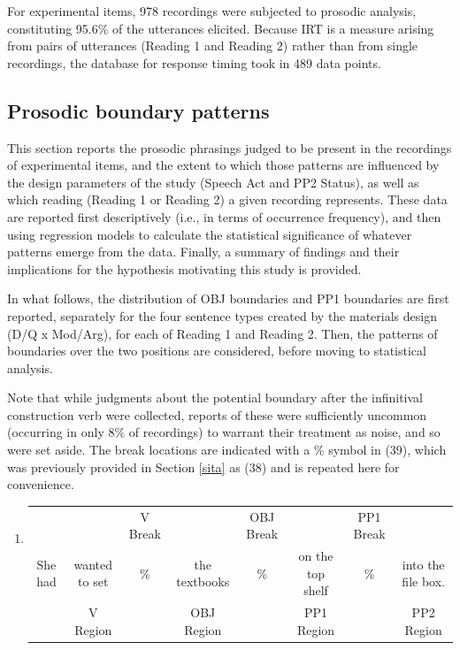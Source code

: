 \documentclass[11pt,oneside]{book}
\providecommand{\tightlist}{%
  \setlength{\itemsep}{0pt}\setlength{\parskip}{0pt}}
\begin{document}
For experimental items, 978 recordings were subjected to prosodic analysis, constituting 95.6\% of the utterances elicited. Because IRT is a measure arising from pairs of utterances (Reading 1 and Reading 2) rather than from single recordings, the database for response timing took in 489 data points.

\hypertarget{results-prosody}{%
\subsection{Prosodic boundary patterns}\label{results-prosody}}

This section reports the prosodic phrasings judged to be present in the recordings of experimental items, and the extent to which those patterns are influenced by the design parameters of the study (Speech Act and PP2 Status), as well as which reading (Reading 1 or Reading 2) a given recording represents. These data are reported first descriptively (i.e., in terms of occurrence frequency), and then using regression models to calculate the statistical significance of whatever patterns emerge from the data. Finally, a summary of findings and their implications for the hypothesis motivating this study is provided.

In what follows, the distribution of OBJ boundaries and PP1 boundaries are first reported, separately for the four sentence types created by the materials design (D/Q x Mod/Arg), for each of Reading 1 and Reading 2. Then, the patterns of boundaries over the two positions are considered, before moving to statistical analysis.

Note that while judgments about the potential boundary after the infinitival construction verb were collected, reports of these were sufficiently uncommon (occurring in only 8\% of recordings) to warrant their treatment as noise, and so were set aside. The break locations are indicated with a \% symbol in (39), which was previously provided in Section \ref{sita} as (38) and is repeated here for convenience.

\begin{enumerate}
\def\labelenumi{(\arabic{enumi})}
\setcounter{enumi}{38}
\tightlist
\item
  \begingroup
  \setlength{\tabcolsep}{1pt}

  \begin{tabular}{cccccccc}
    & & \footnotesize V Break & & \footnotesize OBJ Break & & \footnotesize PP1 Break & \\
    She had & wanted to set & \% & the textbooks & \% & on the top shelf & \% & into the file box. \\
    \cmidrule(r){2-2} \cmidrule(r){4-4} \cmidrule(r){6-6} \cmidrule(r){8-8} 
    & \footnotesize V Region & & \footnotesize OBJ Region & & \footnotesize PP1 Region & & PP2 Region \\
  \end{tabular}
    \endgroup
\end{enumerate}
\end{document}

